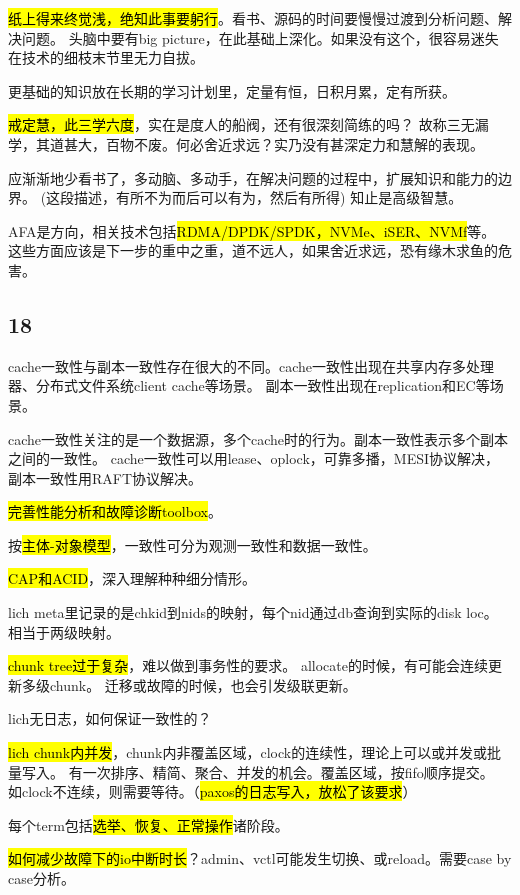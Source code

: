 \hrulefill

\hl{纸上得来终觉浅，绝知此事要躬行}。看书、源码的时间要慢慢过渡到分析问题、解决问题。
头脑中要有big picture，在此基础上深化。如果没有这个，很容易迷失在技术的细枝末节里无力自拔。

更基础的知识放在长期的学习计划里，定量有恒，日积月累，定有所获。

\hl{戒定慧，此三学六度}，实在是度人的船阀，还有很深刻简练的吗？
故称三无漏学，其道甚大，百物不废。何必舍近求远？实乃没有甚深定力和慧解的表现。

应渐渐地少看书了，多动脑、多动手，在解决问题的过程中，扩展知识和能力的边界。
(这段描述，有所不为而后可以有为，然后有所得) 知止是高级智慧。

AFA是方向，相关技术包括\hl{RDMA/DPDK/SPDK，NVMe、iSER、NVMf}等。
这些方面应该是下一步的重中之重，道不远人，如果舍近求远，恐有缘木求鱼的危害。

\subsection{18}

cache一致性与副本一致性存在很大的不同。cache一致性出现在共享内存多处理器、分布式文件系统client cache等场景。
副本一致性出现在replication和EC等场景。

cache一致性关注的是一个数据源，多个cache时的行为。副本一致性表示多个副本之间的一致性。
cache一致性可以用lease、oplock，可靠多播，MESI协议解决，副本一致性用RAFT协议解决。

\hl{完善性能分析和故障诊断toolbox}。

按\hl{主体-对象模型}，一致性可分为观测一致性和数据一致性。

\hl{CAP和ACID}，深入理解种种细分情形。

\hrulefill

lich meta里记录的是chkid到nids的映射，每个nid通过db查询到实际的disk loc。
相当于两级映射。

\hl{chunk tree过于复杂}，难以做到事务性的要求。
allocate的时候，有可能会连续更新多级chunk。
迁移或故障的时候，也会引发级联更新。

lich无日志，如何保证一致性的？

\hl{lich chunk内并发}，chunk内非覆盖区域，clock的连续性，理论上可以或并发或批量写入。
有一次排序、精简、聚合、并发的机会。覆盖区域，按fifo顺序提交。
如clock不连续，则需要等待。（\hl{paxos的日志写入，放松了该要求}）

每个term包括\hl{选举、恢复、正常操作}诸阶段。

\hl{如何减少故障下的io中断时长}？admin、vctl可能发生切换、或reload。需要case by case分析。

